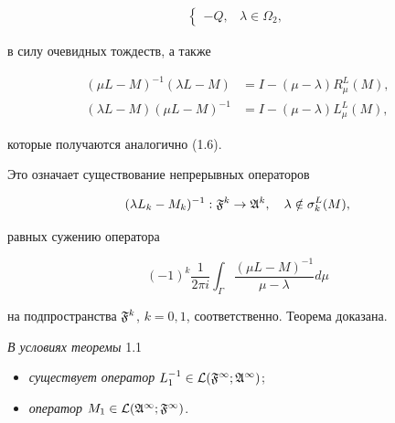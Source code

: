 \begin{pf}
\begin{align*}
\begin{cases}
-Q, & \lambda\in\Omega_2, 


\end{cases} 


\end{align*} 


в силу очевидных тождеств, а также 


\begin{align*} 


(\mu L-M)^{-1}(\lambda L-M) &= I-(\mu-\lambda)R^L_\mu(M),\\ 


(\lambda L-M)(\mu L-M)^{-1} &= I-(\mu-\lambda)L^L_\mu(M), 


\end{align*} 


которые получаются аналогично (1.6). 


 


Это означает существование непрерывных операторов 


$$ 


(\lambda L_k-M_k)^{-1}:\frak F^k\to \frak A^k, \quad 


\lambda\notin \sigma^L_k(M), 


$$ 


равных сужению оператора 


$$ 


(-1)^k\frac{1}{2\pi i}\int_\Gamma\frac{(\mu L-M)^{-1}}{\mu-\lambda}d\mu 


$$ 


на подпространства $\frak F^k$, $k=0,1$, соответственно. Теорема доказана. 


\end{pf} 


 


\begin{corm} {\it В условиях теоремы} 1.1 


\begin{itemize} 


\item[(i)] {\it существует оператор} $L^{-1}_1\in\cal L(\frak F^1;\frak A^1)$; 


\item[(ii)] {\it оператор} $M_1\in\cal L(\frak A^1;\frak F^1)$. 


\end{itemize}


\end{corm} 


